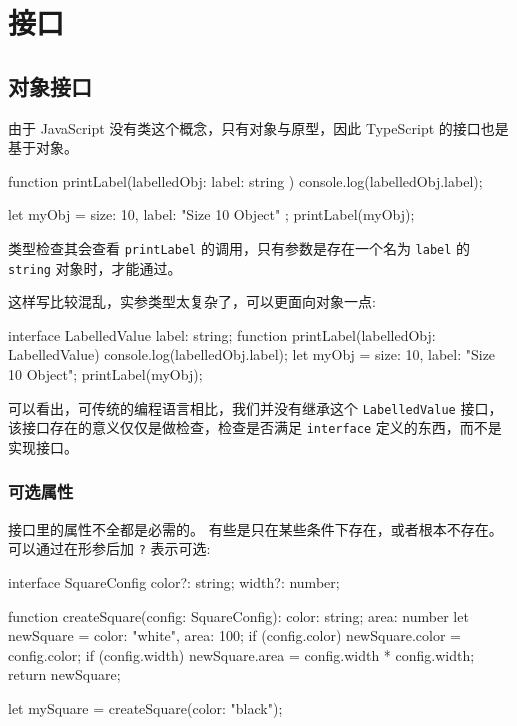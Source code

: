 \section{接口}

\subsection{对象接口}

由于 JavaScript 没有类这个概念，只有对象与原型，因此 TypeScript 的接口也是基于对象。

\begin{TypeScript}
function printLabel(labelledObj: { label: string }) {
    console.log(labelledObj.label);
}
  
let myObj = { size: 10, label: "Size 10 Object" };
printLabel(myObj);
\end{TypeScript}

类型检查其会查看 \texttt{printLabel} 的调用，只有参数是存在一个名为 \texttt{label} 的 \texttt{string} 对象时，才能通过。

这样写比较混乱，实参类型太复杂了，可以更面向对象一点:

\begin{TypeScript}
interface LabelledValue {
    label: string;
}
function printLabel(labelledObj: LabelledValue) {
    console.log(labelledObj.label);
}
let myObj = {size: 10, label: "Size 10 Object"};
printLabel(myObj);
\end{TypeScript}

可以看出，可传统的编程语言相比，我们并没有继承这个 \texttt{LabelledValue} 接口，该接口存在的意义仅仅是做检查，检查是否满足 \texttt{interface} 定义的东西，而不是实现接口。

\subsubsection*{可选属性}

接口里的属性不全都是必需的。 有些是只在某些条件下存在，或者根本不存在。可以通过在形参后加 \texttt{?} 表示可选: 

\begin{TypeScript}
interface SquareConfig {
    color?: string;
    width?: number;
}

function createSquare(config: SquareConfig): {color: string; area: number} {
    let newSquare = {color: "white", area: 100};
    if (config.color) {
        newSquare.color = config.color;
    }
    if (config.width) {
        newSquare.area = config.width * config.width;
    }
    return newSquare;
}

let mySquare = createSquare({color: "black"});
\end{TypeScript}

